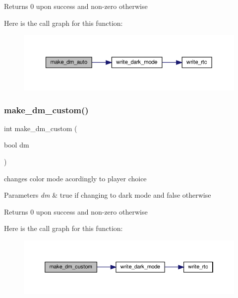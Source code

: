 \begin{DoxyReturn}{Returns}
0 upon success and non-\/zero otherwise 
\end{DoxyReturn}
Here is the call graph for this function\+:\nopagebreak
\begin{figure}[H]
\begin{center}
\leavevmode
\includegraphics[width=350pt]{group__RealTimeClock_ga7e3748780d4ab4b2f87949e477dba28c_cgraph}
\end{center}
\end{figure}
\mbox{\label{group__RealTimeClock_ga6dc7d0ef0bd75dbcf8581510fe4b224a}} 
\subsubsection{\texorpdfstring{make\+\_\+dm\+\_\+custom()}{make\_dm\_custom()}}
{\footnotesize\ttfamily int make\+\_\+dm\+\_\+custom (\begin{DoxyParamCaption}\item[{bool}]{dm }\end{DoxyParamCaption})}



changes color mode acordingly to player choice 


\begin{DoxyParams}{Parameters}
{\em dm} & true if changing to dark mode and false otherwise \\
\hline
\end{DoxyParams}
\begin{DoxyReturn}{Returns}
0 upon success and non-\/zero otherwise 
\end{DoxyReturn}
Here is the call graph for this function\+:\nopagebreak
\begin{figure}[H]
\begin{center}
\leavevmode
\includegraphics[width=350pt]{group__RealTimeClock_ga6dc7d0ef0bd75dbcf8581510fe4b224a_cgraph}
\end{center}
\end{figure}
\mbox{\label{group__RealTimeClock_gae37f65cb1eda30db92728dc94bb52b76}} 
